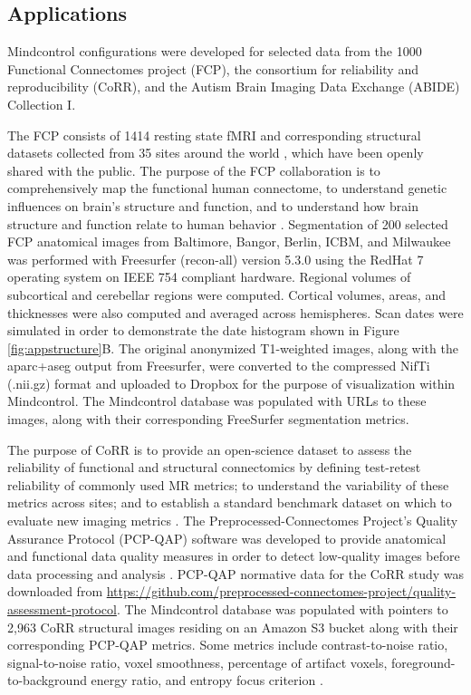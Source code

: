 \subsection{Applications}

Mindcontrol configurations were developed for selected data from the 1000 Functional Connectomes project (FCP), the consortium for reliability and reproducibility (CoRR), and the Autism Brain Imaging Data Exchange (ABIDE) Collection I. 

The FCP consists of 1414 resting state fMRI and corresponding structural datasets collected from 35 sites around the world  \cite{biswal2010toward}, which have been openly shared with the public. The purpose of the FCP collaboration is to comprehensively map the functional human connectome, to understand genetic influences on brain's structure and function, and to understand how brain structure and function relate to human behavior \cite{biswal2010toward}. Segmentation of 200 selected FCP anatomical images from Baltimore, Bangor, Berlin, ICBM, and Milwaukee was performed with Freesurfer (recon-all) version 5.3.0 \cite{fischl2002whole} using the RedHat 7 operating system on IEEE 754 compliant hardware. Regional volumes of  subcortical and cerebellar regions were computed. Cortical volumes, areas, and thicknesses were also computed and averaged across hemispheres. Scan dates were simulated in order to demonstrate the date histogram shown in Figure \ref{fig:appstructure}B. The original anonymized T1-weighted images, along with the aparc+aseg output from Freesurfer, were converted to the compressed NifTi (.nii.gz) format and uploaded to Dropbox for the purpose of visualization within Mindcontrol. The Mindcontrol database was populated with URLs to these images, along with their corresponding FreeSurfer segmentation metrics.

The purpose of CoRR is to provide an open-science dataset to assess the reliability of functional and structural connectomics by defining test-retest reliability of commonly used MR metrics; to understand the variability of these metrics across sites; and to establish a standard benchmark dataset on which to evaluate new imaging metrics \cite{Zuo_2014}. The Preprocessed-Connectomes Project's Quality Assurance Protocol (PCP-QAP) software was developed to provide anatomical and functional data quality measures in order to detect low-quality images before data processing and analysis \cite{shehzadpreprocessed}. PCP-QAP normative data for the CoRR study was downloaded from \href{http://raw.githubusercontent.com/preprocessed-connectomes-project/quality-assessment-protocol/master/poster_data/corr_anat.csv}{https://github.com/preprocessed-connectomes-project/quality-assessment-protocol}. The Mindcontrol database was populated with pointers to 2,963 CoRR structural images residing on an Amazon S3 bucket along with their corresponding PCP-QAP metrics. Some metrics include contrast-to-noise ratio, signal-to-noise ratio, voxel smoothness, percentage of artifact voxels, foreground-to-background energy ratio, and entropy focus criterion \cite{shehzadpreprocessed}. 

